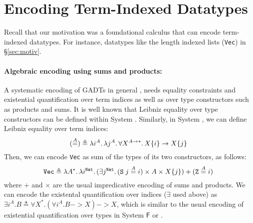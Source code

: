 \section{Encoding Term-Indexed Datatypes} \label{sec:data}
Recall that our motivation was a foundational calculus
that can encode term-indexed datatypes. For instance, 
datatypes like the length indexed lists ({\small\tt Vec}) in \S\ref{sec:motiv}.

\paragraph{Algebraic encoding using sums and products:}

A systematic encoding of GADTs in general
\cite{Sheard04equality,Crary98},
needs equality constraints and existential quantification
over term indices as well as over type constructors such as products and sums.
It is well known that Leibniz equality over type constructors
can be defined within System \Fw. %
Similarly, in System \Fi, we can define Leibniz equality over term indices:
\[
(\stackrel{A}{=}) \triangleq
        \lambda i^A.\, \lambda j^A.\, \forall X^{A\to*}.\, X\{i\}\to X\{j\}
\]
Then, we can encode {\small\tt Vec} as sum of the types of its two constructors,
as follows:
\[ \mathtt{Vec} \triangleq \lambda A^{*}.\,\lambda i^\texttt{Nat}.\,
        (\exists j^\texttt{Nat}.\,(\texttt{S}\;j\stackrel{A}{=}i)\times A \times X\{j\})
        +
        (\texttt{Z}\stackrel{A}{=}i)
\]
where $+$ and $\times$ are the usual impredicative encoding of sums
and products. We can encode the existental quantification over indices
($\exists$ used above) as
$ \exists i^A.B \triangleq \forall X^{*}. (\forall i^A.B -> X) -> X $,
which is similar to the usual encoding of existential quantification
over types in System $\mathsf{F}$ or \Fw.

